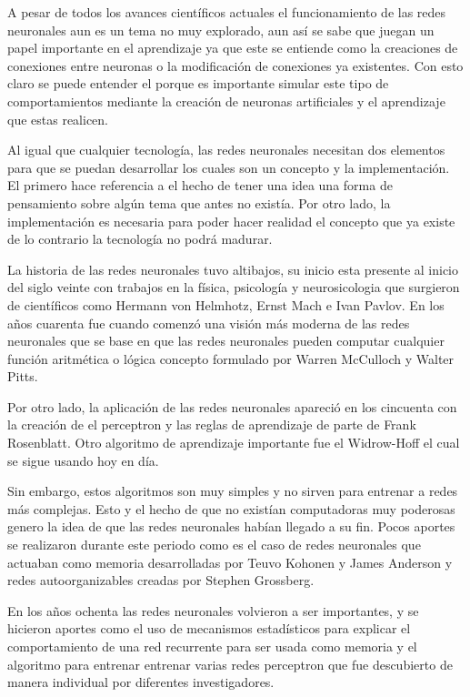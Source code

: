\documentclass{article}
\begin{document}
A pesar de todos los avances científicos actuales el funcionamiento de las redes neuronales aun es un tema no muy explorado, aun así se sabe que juegan un papel importante en el aprendizaje ya que este se entiende como la creaciones de conexiones entre neuronas o la modificación de conexiones ya existentes. Con esto claro se puede entender el porque es importante simular este tipo de comportamientos mediante la creación de neuronas artificiales y el aprendizaje que estas realicen.

Al igual que cualquier tecnología, las redes neuronales necesitan dos elementos para que se puedan desarrollar los cuales son un concepto y la implementación. El primero hace referencia a el hecho de tener una idea una forma de pensamiento sobre algún tema que antes no existía. Por otro lado, la implementación es necesaria para poder hacer realidad el concepto que ya existe de lo contrario la tecnología no podrá madurar.

La historia de las redes neuronales tuvo altibajos, su inicio esta presente al inicio del siglo veinte con trabajos en la física, psicología y neurosicologia que surgieron de científicos como Hermann von Helmhotz, Ernst Mach e Ivan Pavlov. En los años cuarenta fue cuando comenzó una visión más moderna de las redes neuronales que se base en que las redes neuronales pueden computar cualquier función aritmética o lógica concepto formulado por Warren McCulloch y Walter Pitts.

Por otro lado, la aplicación de las redes neuronales apareció en los cincuenta con la creación de el perceptron y las reglas de aprendizaje de parte de Frank Rosenblatt. Otro algoritmo de aprendizaje importante fue el Widrow-Hoff el cual se sigue usando hoy en día. 

Sin embargo, estos algoritmos son muy simples y no sirven para entrenar a redes más complejas. Esto y el hecho de que no existían computadoras muy poderosas genero la idea de que las redes neuronales habían llegado a su fin. Pocos aportes se realizaron durante este periodo como es el caso de redes neuronales que actuaban como memoria desarrolladas por Teuvo Kohonen y James Anderson y redes autoorganizables creadas por Stephen Grossberg.

En los años ochenta las redes neuronales volvieron a ser importantes, y se hicieron aportes como el uso de mecanismos estadísticos para explicar el comportamiento de una red recurrente para ser usada como memoria y el algoritmo para entrenar entrenar varias redes perceptron que fue descubierto de manera individual por diferentes investigadores.
\end{document}
